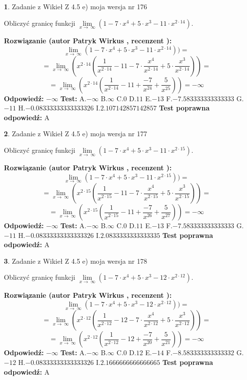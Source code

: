 \documentclass[12pt, a4paper]{article}
\theoremstyle{definition} %
\newtheorem{zad}{}
\newcommand{\zadStart}[1]{\begin{zad}#1\newline}
\newcommand{\zadStop}{\end{zad}}
\newcommand{\rozwStart}[2]{\noindent \textbf{Rozwiązanie (autor #1 , recenzent #2): }\newline}
\newcommand{\rozwStop}{\newline}
\newcommand{\odpStart}{\noindent \textbf{Odpowiedź:}\newline}
\newcommand{\odpStop}{\newline}
\newcommand{\testStart}{\noindent \textbf{Test:}\newline}
\newcommand{\testStop}{\newline}
\newcommand{\kluczStart}{\noindent \textbf{Test poprawna odpowiedź:}\newline}
\newcommand{\kluczStop}{\newline}
\begin{document}
\zadStart{Zadanie z Wikieł Z 4.5 e) moja wersja nr 176}


Obliczyć granicę funkcji  $\lim\limits_{x\to\ \infty}(1 - 7 \cdot x^{4}+5 \cdot x^{3}- 11 \cdot x^{2\cdot14})$.
\zadStop
\rozwStart{Patryk Wirkus}{}
$$\lim\limits_{x\to\ \infty}(1 - 7 \cdot x^{4}+5 \cdot x^{3}- 11 \cdot x^{2\cdot14}))=$$
$$=\lim\limits_{x\to\ \infty}(x^{2\cdot14}(\frac{1}{x^{2\cdot14}}-11 -7 \cdot \frac{x^{4}}{x^{2\cdot14}}+5 \cdot \frac{x^{3}}{x^{2\cdot14}}))=$$
$$=\lim\limits_{x\to\ \infty}(x^{2\cdot14}(\frac{1}{x^{2\cdot14}}-11 + \frac{-7}{x^{24}}+ \frac{5}{x^{25}}))=-\infty$$
\rozwStop
\odpStart
$-\infty$
\odpStop
\testStart
A.$-\infty$ B.$\infty$ C.$0$ D.$11$ E.$-13$
F.$-7.583333333333333$ G.$-11$
H.$-0.08333333333333326$
I.$2.107142857142857$
\testStop
\kluczStart
A
\kluczStop



\zadStart{Zadanie z Wikieł Z 4.5 e) moja wersja nr 177}


Obliczyć granicę funkcji  $\lim\limits_{x\to\ \infty}(1 - 7 \cdot x^{4}+5 \cdot x^{3}- 11 \cdot x^{2\cdot15})$.
\zadStop
\rozwStart{Patryk Wirkus}{}
$$\lim\limits_{x\to\ \infty}(1 - 7 \cdot x^{4}+5 \cdot x^{3}- 11 \cdot x^{2\cdot15}))=$$
$$=\lim\limits_{x\to\ \infty}(x^{2\cdot15}(\frac{1}{x^{2\cdot15}}-11 -7 \cdot \frac{x^{4}}{x^{2\cdot15}}+5 \cdot \frac{x^{3}}{x^{2\cdot15}}))=$$
$$=\lim\limits_{x\to\ \infty}(x^{2\cdot15}(\frac{1}{x^{2\cdot15}}-11 + \frac{-7}{x^{26}}+ \frac{5}{x^{27}}))=-\infty$$
\rozwStop
\odpStart
$-\infty$
\odpStop
\testStart
A.$-\infty$ B.$\infty$ C.$0$ D.$11$ E.$-13$
F.$-7.583333333333333$ G.$-11$
H.$-0.08333333333333326$
I.$2.0833333333333335$
\testStop
\kluczStart
A
\kluczStop



\zadStart{Zadanie z Wikieł Z 4.5 e) moja wersja nr 178}


Obliczyć granicę funkcji  $\lim\limits_{x\to\ \infty}(1 - 7 \cdot x^{4}+5 \cdot x^{3}- 12 \cdot x^{2\cdot12})$.
\zadStop
\rozwStart{Patryk Wirkus}{}
$$\lim\limits_{x\to\ \infty}(1 - 7 \cdot x^{4}+5 \cdot x^{3}- 12 \cdot x^{2\cdot12}))=$$
$$=\lim\limits_{x\to\ \infty}(x^{2\cdot12}(\frac{1}{x^{2\cdot12}}-12 -7 \cdot \frac{x^{4}}{x^{2\cdot12}}+5 \cdot \frac{x^{3}}{x^{2\cdot12}}))=$$
$$=\lim\limits_{x\to\ \infty}(x^{2\cdot12}(\frac{1}{x^{2\cdot12}}-12 + \frac{-7}{x^{20}}+ \frac{5}{x^{21}}))=-\infty$$
\rozwStop
\odpStart
$-\infty$
\odpStop
\testStart
A.$-\infty$ B.$\infty$ C.$0$ D.$12$ E.$-14$
F.$-8.583333333333332$ G.$-12$
H.$-0.08333333333333326$
I.$2.1666666666666665$
\testStop
\kluczStart
A
\kluczStop
\end{document}
